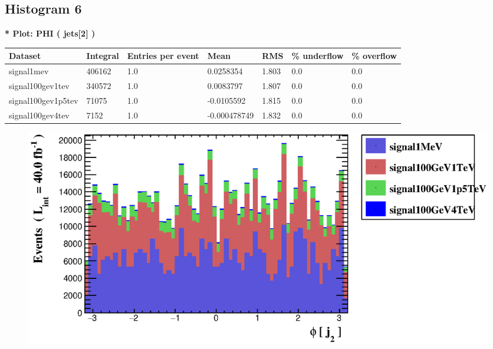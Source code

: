 \documentclass[a4paper, 10pt]{article}
\begin{document}
\subsection{ Histogram 6}

\textbf{* Plot: PHI ( jets[2] ) }\\
   \begin{table}[H]
  \begin{center}
    \begin{tabular}{|m{23.0mm}|m{23.0mm}|m{18.0mm}|m{19.0mm}|m{19.0mm}|m{19.0mm}|m{19.0mm}|}
      \hline
      {\cellcolor{yellow}         Dataset}& {\cellcolor{yellow}         Integral}& {\cellcolor{yellow}         Entries per event}& {\cellcolor{yellow}         Mean}& {\cellcolor{yellow}         RMS}& {\cellcolor{yellow}         \% underflow}& {\cellcolor{yellow}         \% overflow}\\
      \hline
      {\cellcolor{white}         signal1mev}& {\cellcolor{white}         406162}& {\cellcolor{white}         1.0}& {\cellcolor{white}         0.0258354}& {\cellcolor{white}         1.803}& {\cellcolor{green}         0.0}& {\cellcolor{green}         0.0}\\
      \hline
      {\cellcolor{white}         signal100gev1tev}& {\cellcolor{white}         340572}& {\cellcolor{white}         1.0}& {\cellcolor{white}         0.0083797}& {\cellcolor{white}         1.807}& {\cellcolor{green}         0.0}& {\cellcolor{green}         0.0}\\
      \hline
      {\cellcolor{white}         signal100gev1p5tev}& {\cellcolor{white}         71075}& {\cellcolor{white}         1.0}& {\cellcolor{white}         -0.0105592}& {\cellcolor{white}         1.815}& {\cellcolor{green}         0.0}& {\cellcolor{green}         0.0}\\
      \hline
      {\cellcolor{white}         signal100gev4tev}& {\cellcolor{white}         7152}& {\cellcolor{white}         1.0}& {\cellcolor{white}         -0.000478749}& {\cellcolor{white}         1.832}& {\cellcolor{green}         0.0}& {\cellcolor{green}         0.0}\\
\hline
    \end{tabular}
  \end{center}
\end{table}

\begin{figure}[H]
  \begin{center}
    \includegraphics[scale=0.45]{selection_5.eps}\\
\caption{   }
  \end{center}
\end{figure}
      \newpage
\end{document}
